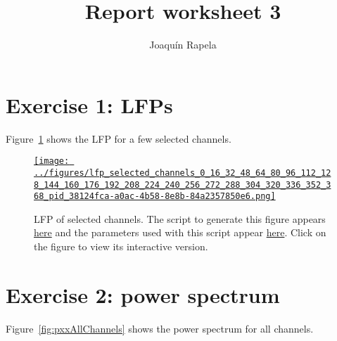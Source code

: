 \documentclass[12pt]{article}
\title{Report worksheet 3}
\author{Joaqu\'{i}n Rapela}
\begin{document}
\maketitle

\section*{Exercise 1: LFPs}

Figure~\ref{fig:lfpSelectedChannels1} shows the LFP for a few selected channels.


\begin{figure}[H]
    \begin{center}
        \href{https://www.gatsby.ucl.ac.uk/~rapela/neuroinformatics/2023/ws3/figures/lfp_selected_channels_0_16_32_48_64_80_96_112_128_144_160_176_192_208_224_240_256_272_288_304_320_336_352_368_pid_38124fca-a0ac-4b58-8e8b-84a2357850e6.html}{\texttt{[image: ../figures/lfp\_selected\_channels\_0\_16\_32\_48\_64\_80\_96\_112\_128\_144\_160\_176\_192\_208\_224\_240\_256\_272\_288\_304\_320\_336\_352\_368\_pid\_38124fca-a0ac-4b58-8e8b-84a2357850e6.png]}}
        \caption{LFP of selected channels.
                The script to generate
                this figure appears
                \href{https://github.com/joacorapela/neuroinformatics23/blob/master/worksheets/ws3/mySolution/code/scripts/doPlotSomeChannelsLFPs.py}{here}
                and the parameters used with this script appear
                \href{https://github.com/joacorapela/neuroinformatics23/blob/master/worksheets/ws3/mySolution/code/scripts/doPlotSomeChannelsLFPs.csh}{here}.
                Click on the figure to view its interactive version.
                }

                \label{fig:lfpSelectedChannels1}

            \end{center}
        \end{figure}

\section*{Exercise 2: power spectrum}

Figure~\ref{fig:pxxAllChannels} shows the power spectrum for all
channels.
\end{document}
